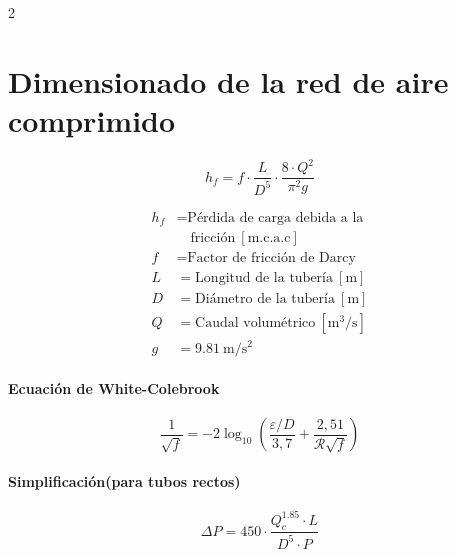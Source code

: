 \documentclass[11pt]{article}
\begin{document}
\begin{multicols*}{2}
\begin{minipage}{\linewidth}
    \end{minipage}

    \section*{Dimensionado de la red de aire comprimido}

    \begin{equation}
        h_f = f \cdot \frac{L}{D^5} \cdot \frac{8 \cdot Q^2}{\pi^2 g}
    \end{equation}

    \begin{minipage}{\linewidth}
        \begin{align*}
            h_f &= \text{Pérdida de carga debida a la} \\
            &\quad \text{fricción} \ \mathrm{[m.c.a.c]} \\
            f &= \text{Factor de fricción de Darcy} \\
            L &= \text{Longitud de la tubería} \ \mathrm{[m]} \\
            D &= \text{Diámetro de la tubería} \ \mathrm{[m]} \\
            Q &= \text{Caudal volumétrico} \ \mathrm{[m^3/s]} \\
            g &= 9.81 \ \mathrm{m/s^2}
        \end{align*}
    \end{minipage}

    \paragraph*{Ecuación de White-Colebrook}

    \begin{equation}
        \frac{1}{\sqrt{f}} = -2 \log_{10} \left( \frac{\varepsilon/D}{3,7} + \frac{2,51}{\mathcal{R}\sqrt{f}} \right)
    \end{equation}

    \paragraph{Simplificación(para tubos rectos)}

    \begin{equation}
        \Delta P = 450 \cdot \frac{Q_{c}^{1.85} \cdot L}{D^{5} \cdot P}
    \end{equation}


\end{multicols*}
\end{document}
